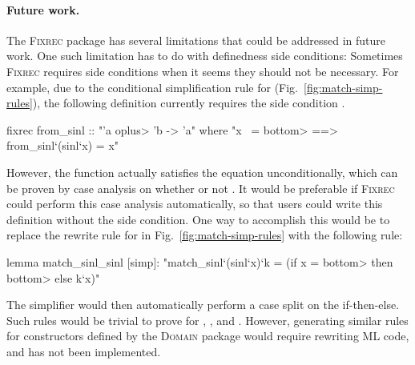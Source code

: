 \paragraph{Future work.} The \textsc{Fixrec} package has several limitations that could be addressed in future work. One such limitation has to do with definedness side conditions: Sometimes \textsc{Fixrec} requires side conditions when it seems they should not be necessary. For example, due to the conditional simplification rule for  (Fig.~\ref{fig:match-simp-rules}), the following definition currently requires the side condition .
%
\begin{isacode}
fixrec from_sinl :: "'a \<oplus> 'b -> 'a"
  where "x ~= \<bottom> ==> from_sinl`(sinl`x) = x"
\end{isacode}
%
However, the function  actually satisfies the equation  unconditionally, which can be proven by case analysis on whether or not . It would be preferable if \textsc{Fixrec} could perform this case analysis automatically, so that users could write this definition without the side condition. One way to accomplish this would be to replace the rewrite rule for  in Fig.~\ref{fig:match-simp-rules} with the following rule:
%
\begin{isacode}
lemma match_sinl_sinl [simp]:
  "match_sinl`(sinl`x)`k = (if x = \<bottom> then \<bottom> else k`x)"
\end{isacode}
%
The simplifier would then automatically perform a case split on the if-then-else. Such rules would be trivial to prove for , , and . However, generating similar rules for constructors defined by the \textsc{Domain} package would require rewriting ML code, and has not been implemented.

